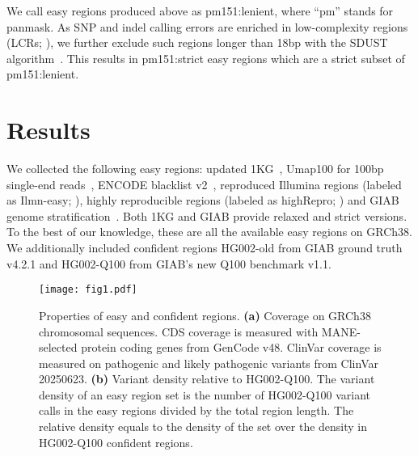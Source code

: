 \documentclass[webpdf,contemporary,large,namedate]{oup-authoring-template}%
\begin{document}
We call easy regions produced above as {\sf pm151:lenient}, where ``pm'' stands for panmask.
As SNP and indel calling errors are enriched in low-complexity regions (LCRs; \citealp{Li:2014aa}),
we further exclude such regions longer than 18bp with the SDUST algorithm~\citep{Morgulis:2006aa}.
This results in {\sf pm151:strict} easy regions which are a strict subset of {\sf pm151:lenient}.

\section{Results}

We collected the following easy regions:
updated {\sf 1KG}~\citep{1000-Genomes-Project-Consortium:2010qc},
{\sf Umap100} for 100bp single-end reads~\citep{Karimzadeh:2018aa},
{\sf ENCODE} blacklist v2~\citep{Amemiya:2019aa},
reproduced Illumina regions (labeled as {\sf Ilmn-easy}; \citealp{Aganezov:2022aa}),
highly reproducible regions (labeled as {\sf highRepro}; \citealp{Pan:2022aa})
and {\sf GIAB} genome stratification~\citep{Dwarshuis:2024aa}.
Both {\sf 1KG} and {\sf GIAB} provide relaxed and strict versions.
To the best of our knowledge, these are all the available easy regions on GRCh38.
We additionally included confident regions {\sf HG002-old} from GIAB ground truth v4.2.1
and {\sf HG002-Q100} from GIAB's new Q100 benchmark v1.1.

\begin{figure}[tb]
\centering
\texttt{[image: fig1.pdf]}
\caption{Properties of easy and confident regions.
{\bf (a)} Coverage on GRCh38 chromosomal sequences.
CDS coverage is measured with MANE-selected protein coding genes from GenCode v48.
ClinVar coverage is measured on pathogenic and likely pathogenic variants from ClinVar 20250623.
{\bf (b)} Variant density relative to HG002-Q100.
The variant density of an easy region set is the number of HG002-Q100 variant calls in the easy regions divided by the total region length.
The relative density equals to the density of the set over the density in HG002-Q100 confident regions.
}\label{fig:cov}
\end{figure}
\end{document}
